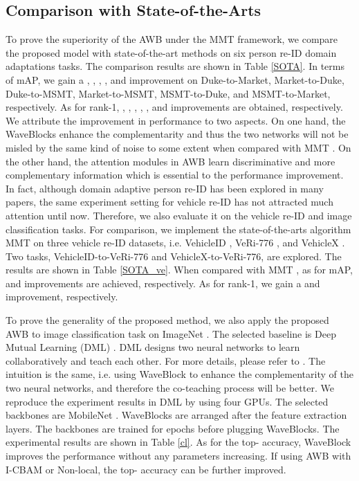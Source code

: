 \documentclass[journal]{IEEEtran}
\begin{document}
\subsection{Comparison with State-of-the-Arts}
To prove the superiority of the AWB under the MMT \cite{ge2020mutual} framework, we compare the proposed model with state-of-the-art methods on six person re-ID domain adaptations tasks. The comparison results are shown in Table \ref{SOTA}. In terms of mAP, we gain a , , , ,  and  improvement on Duke-to-Market, Market-to-Duke, Duke-to-MSMT, Market-to-MSMT, MSMT-to-Duke, and MSMT-to-Market, respectively. As for rank-1, , , , , , and  improvements are obtained, respectively. We attribute the improvement in performance to two aspects. On one hand, the WaveBlocks enhance the complementarity and thus the two networks will not be misled by the same kind of noise to some extent when compared with MMT \cite{ge2020mutual}. On the other hand, the attention modules in AWB learn discriminative and more complementary information which is essential to the performance improvement. In fact, although domain adaptive person re-ID has been explored in many papers, the same experiment setting for vehicle re-ID has not attracted much attention until now. Therefore, we also evaluate it on the vehicle re-ID and image classification tasks. For comparison, we implement the state-of-the-arts algorithm MMT \cite{ge2020mutual} on three vehicle re-ID datasets, i.e. VehicleID \cite{liu_2016deep}, VeRi-776 \cite{liu2016deep}, and VehicleX \cite{naphade20204th}. Two tasks, VehicleID-to-VeRi-776 and VehicleX-to-VeRi-776, are explored. The results are shown in Table \ref{SOTA_ve}. When compared with MMT \cite{ge2020mutual}, as for mAP,  and  improvements are achieved, respectively. As for rank-1, we gain a  and  improvement, respectively. \par 
















To prove the generality of the proposed method, we also apply the proposed AWB to image classification task on ImageNet \cite{deng2009imagenet}. The selected baseline is Deep Mutual Learning (DML) \cite{zhang2018deep}. DML \cite{zhang2018deep} designs two neural networks to learn collaboratively and teach each other. For more details, please refer to \cite{zhang2018deep}. The intuition is the same, i.e. using WaveBlock to enhance the complementarity of the two neural networks, and therefore the co-teaching process will be better. We reproduce the experiment results in DML  \cite{zhang2018deep} by using four GPUs. The selected backbones are MobileNet \cite{howard2017mobilenets}. WaveBlocks are arranged after the feature extraction layers. The backbones are trained for  epochs before plugging WaveBlocks. The experimental results are shown in Table \ref{cl}. As for the top- accuracy, WaveBlock improves the performance without any parameters increasing. If using AWB with I-CBAM or Non-local, the top- accuracy can be further improved.
\end{document}
